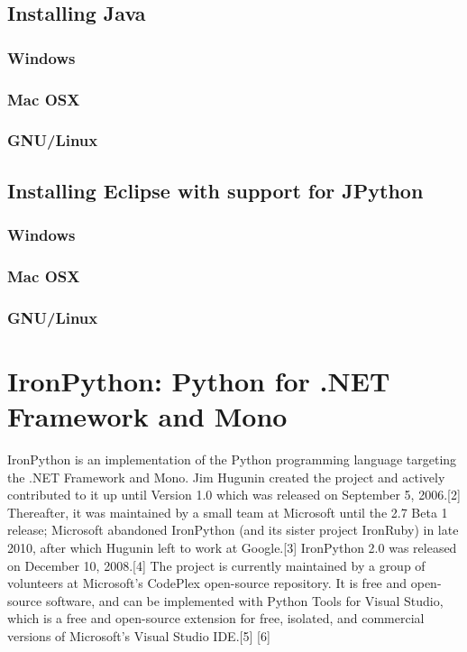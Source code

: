 \subsection{Installing Java}

\subsubsection{Windows}

\subsubsection{Mac OSX}

\subsubsection{GNU/Linux}



\subsection{Installing Eclipse with support for JPython}


\subsubsection{Windows}

\subsubsection{Mac OSX}

\subsubsection{GNU/Linux}





\newpage
\section{IronPython: Python for .NET Framework and Mono}


IronPython is an implementation of the Python programming language targeting the .NET Framework and Mono. Jim Hugunin created the project and actively contributed to it up until Version 1.0 which was released on September 5, 2006.[2] Thereafter, it was maintained by a small team at Microsoft until the 2.7 Beta 1 release; Microsoft abandoned IronPython (and its sister project IronRuby) in late 2010, after which Hugunin left to work at Google.[3] IronPython 2.0 was released on December 10, 2008.[4] The project is currently maintained by a group of volunteers at Microsoft's CodePlex open-source repository. It is free and open-source software, and can be implemented with Python Tools for Visual Studio, which is a free and open-source extension for free, isolated, and commercial versions of Microsoft's Visual Studio IDE.[5] [6]

